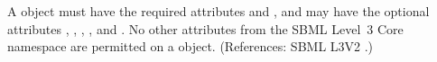 A \Compartment object must have the required attributes  and
, and may have the optional attributes ,
, , ,  and
.  No other attributes from the SBML Level~3 Core namespace
are permitted on a \Compartment object.  (References: SBML L3V2
.)
